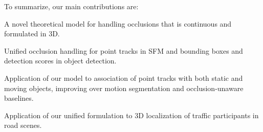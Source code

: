 To summarize, our main contributions are:
\vspace{-0.2cm}
\begin{tight_itemize}
\item A novel theoretical model for handling occlusions that is continuous and formulated in 3D.
\item Unified occlusion handling for point tracks in SFM and bounding boxes and detection scores in object detection.
\item Application of our model to association of point tracks with both static and moving objects, improving over motion segmentation and occlusion-unaware baselines.
\item Application of our unified formulation to 3D localization of traffic participants in road scenes.
\end{tight_itemize}





